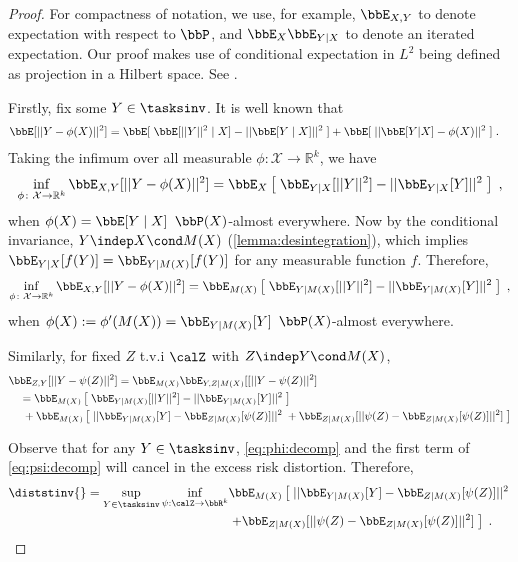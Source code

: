 \documentclass[final]{article}
\begin{document}
\begin{proof}
	For compactness of notation, we use, for example, $\bbE_{X,Y}$ to denote expectation with respect to $\bbP$, and $\bbE_X \bbE_{Y|X}$ to denote an iterated expectation. Our proof makes use of conditional expectation in $L^2$ being defined as projection in a Hilbert space. See \citep[e.g.,][Ch.\ 22-23]{jacod_probability_2004}.

	Firstly, fix some $Y\in \tasksinv$. It is well known that
	\begin{align*}
	    \bbE[||Y - \phi(X)||^2] & = \bbE[\; \bbE[||Y||^2\mid X] - ||\bbE[Y\mid X]||^2 \;] + \bbE[\; ||\bbE[Y|X] - \phi(X)||^2 \;] \;.
	\end{align*}
	Taking the infimum over all measurable $\phi\colon \mathcal{X} \to \mathbb{R}^k$, we have
	\begin{align*} 
	    \inf_{\phi\colon \mathcal{X} \to \mathbb{R}^k} \bbE_{X,Y}[||Y - \phi(X)||^2] = \bbE_{X}\left[\; \bbE_{Y|X}[||Y||^2 ] - ||\bbE_{Y|X}[Y]||^2 \; \right] \;,
	\end{align*}
	when $\phi(X) = \bbE[Y\mid X]$ $\bbP(X)$-almost everywhere. Now by the conditional invariance, $Y \indep X \cond M(X)$ (\cref{lemma:desintegration}), which implies $\bbE_{Y|X}[f(Y)] = \bbE_{Y|M(X)}[f(Y)]$ for any measurable function $f$. Therefore, 
	\begin{align} \label{eq:phi:decomp}
	    \inf_{\phi\colon \mathcal{X} \to \mathbb{R}^k} \bbE_{X,Y}[||Y - \phi(X)||^2] = \bbE_{M(X)}\left[\; \bbE_{Y|M(X)}[||Y||^2 ] - ||\bbE_{Y|M(X)}[Y]||^2 \; \right] \;,
	\end{align}
	when $\phi(X) := \phi'(M(X)) = \bbE_{Y|M(X)}[Y]$ $\bbP(X)$-almost everywhere.

	Similarly, for fixed $Z$ t.v.i $\calZ$ with $Z \indep Y \cond M(X)$,
	\begin{align} \label{eq:psi:decomp}
    & \bbE_{Z,Y}[||Y - \psi(Z)||^2]  = \bbE_{M(X)} \bbE_{Y,Z|M(X)}[[||Y - \psi(Z)||^2] \\ 
    & \quad = \bbE_{M(X)}\left[\; \bbE_{Y|M(X)}[||Y||^2 ] - ||\bbE_{Y|M(X)}[Y]||^2 \; \right]  \nonumber \\
    & \quad\;  + \bbE_{M(X)}\left[\; ||\bbE_{Y|M(X)}[Y] - \bbE_{Z|M(X)}[\psi(Z)] ||^2 \;  
      + \bbE_{Z|M(X)}[|| \psi(Z) - \bbE_{Z|M(X)}[\psi(Z)]||^2 ] \;\right] \nonumber
	\end{align}

	Observe that for any $Y\in\tasksinv$, \eqref{eq:phi:decomp} and the first term of \eqref{eq:psi:decomp} will cancel in the excess risk distortion. Therefore, 
	\begin{align*}
		\diststinv{} = \sup_{Y \in \tasksinv} \inf_{\psi : \calZ\to\bbR^k} &
			\bbE_{M(X)}\left[\; ||\bbE_{Y|M(X)}[Y] - \bbE_{Z|M(X)}[\psi(Z)] ||^2 \right. \\
      & \left. + \bbE_{Z|M(X)}[|| \psi(Z) - \bbE_{Z|M(X)}[\psi(Z)]||^2 ] \;\right] \;. \nonumber
	\end{align*}
	

\end{proof}
\end{document}

